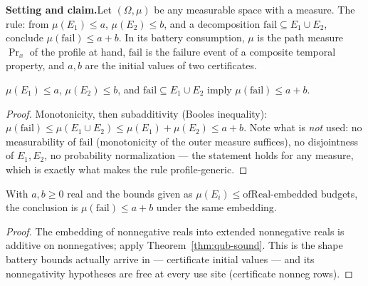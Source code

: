 

\textbf{Setting and claim.}\enspace Let $(\Omega, \mu)$ be any
measurable space with a measure. The rule: from
$\mu(E_1) \le a$, $\mu(E_2) \le b$, and a decomposition
$\mathrm{fail} \subseteq E_1 \cup E_2$, conclude
$\mu(\mathrm{fail}) \le a + b$. In its battery consumption, $\mu$ is the
path measure $\Pr_x$ of the profile at hand, $\mathrm{fail}$ is the
failure event of a composite temporal property, and $a, b$ are the
initial values of two certificates.

\begin{bthm}\label{thm:qub-sound}
$\mu(E_1) \le a$, $\mu(E_2) \le b$, and
$\mathrm{fail} \subseteq E_1 \cup E_2$ imply
$\mu(\mathrm{fail}) \le a + b$.
\end{bthm}
\begin{proof}
Monotonicity, then subadditivity (Boole\textquotesingle s inequality):
$\mu(\mathrm{fail}) \le \mu(E_1 \cup E_2) \le \mu(E_1) + \mu(E_2)
\le a + b$. Note what is \emph{not} used: no measurability of
$\mathrm{fail}$ (monotonicity of the outer measure suffices), no
disjointness of $E_1, E_2$, no probability normalization --- the
statement holds for any measure, which is exactly what makes the rule
profile-generic.
\end{proof}

\begin{bprop}\label{prop:qub-ofreal}
With $a, b \ge 0$ real and the bounds given as
$\mu(E_i) \le \mathrm{ofReal}$-embedded budgets, the conclusion is
$\mu(\mathrm{fail}) \le a + b$ under the same embedding.
\end{bprop}
\begin{proof}
The embedding of nonnegative reals into extended nonnegative reals is
additive on nonnegatives; apply Theorem~\ref{thm:qub-sound}. This is the
shape battery bounds actually arrive in --- certificate initial values
--- and its nonnegativity hypotheses are free at every use site
(certificate nonneg rows).
\end{proof}


